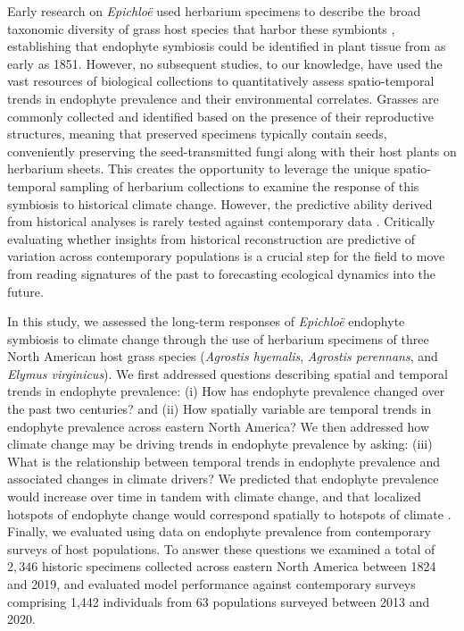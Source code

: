 \documentclass[11pt]{article}
\newcommand{\firstrevise}[1]{{\color{black}{#1}}}
\begin{document}
Early research on \emph{Epichloë} used herbarium specimens to describe the broad taxonomic diversity of grass host species that harbor these symbionts \citep{white1985endophyte}, establishing that endophyte symbiosis could be identified in plant tissue from as early as 1851.
However, no subsequent studies, to our knowledge, have used the vast resources of biological collections to quantitatively assess spatio-temporal trends in endophyte prevalence and their environmental correlates. 
Grasses are commonly collected and identified based on the presence of their reproductive structures, meaning that preserved specimens typically contain seeds, conveniently preserving the seed-transmitted fungi along with their host plants on herbarium sheets. 
This creates the opportunity to leverage the unique spatio-temporal sampling of herbarium collections to examine the response of this symbiosis to historical climate change. 
However, the predictive ability derived from historical analyses is rarely tested against contemporary data \citep{lee2024phenological}. 
Critically evaluating whether insights from historical reconstruction are predictive of variation across contemporary populations is a crucial step for the field to move from reading signatures of the past to forecasting ecological dynamics into the future.

In this study, we assessed the long-term responses of \emph{Epichloë} endophyte symbiosis to climate change through the use of herbarium specimens of three North American host grass species (\emph{Agrostis hyemalis}, \emph{Agrostis perennans}, and \emph{Elymus virginicus}).
We first addressed questions describing spatial and temporal trends in endophyte prevalence: (i) How has endophyte prevalence changed over the past two centuries? and (ii) How spatially variable are temporal trends in endophyte prevalence across eastern North America?
We then addressed how climate change may be driving trends in endophyte prevalence by asking: (iii) What is the relationship between temporal trends in endophyte prevalence and associated changes in climate drivers?
We predicted that \firstrevise{overall} endophyte prevalence would increase over time in tandem with climate change, and that localized hotspots of endophyte change would correspond spatially to hotspots of climate \firstrevise{warming and drying}. 
Finally, we evaluated \firstrevise{(iv) how our model, built on data from historic specimens, performed in an out-of-sample test }using data on endophyte prevalence from contemporary surveys of host populations. 
To answer these questions we examined a total of $2,346$ historic specimens collected across eastern North America between 1824 and 2019, and evaluated model performance against contemporary surveys comprising 1,442 individuals from 63 populations surveyed between 2013 and 2020.
	
\end{document}
